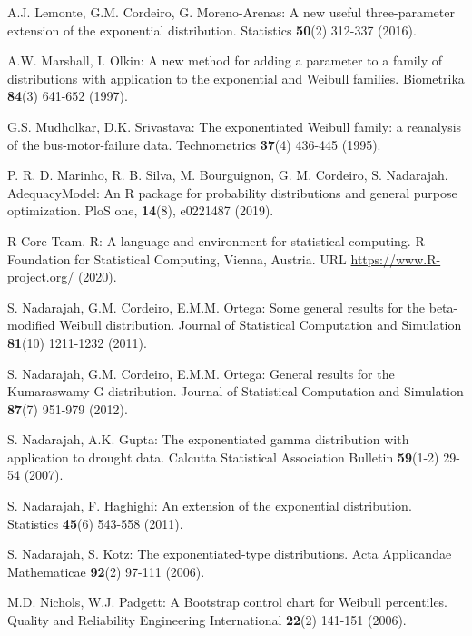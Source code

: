 \documentclass[12pt,a4paper]{article} %
\begin{document}
\begin{description}
\item
A.J. Lemonte, G.M. Cordeiro, G. Moreno-Arenas:
A new useful three-parameter extension of the exponential distribution.
Statistics {\bf 50}(2) 312-337 (2016).

\item
A.W. Marshall, I. Olkin:
A new method for adding a parameter to a family of distributions with
application to the exponential and Weibull families.
Biometrika {\bf 84}(3) 641-652 (1997).

\item
G.S. Mudholkar, D.K. Srivastava:
The exponentiated Weibull family: a reanalysis of the bus-motor-failure data.
Technometrics {\bf 37}(4) 436-445 (1995).

\item
P. R. D. Marinho,  R. B. Silva,  M. Bourguignon, G. M. Cordeiro,  S. Nadarajah. AdequacyModel: An R package for probability distributions and general purpose optimization. PloS one, {\bf 14}(8), e0221487 (2019).

\item
R Core Team. R: A language and environment for statistical computing. R Foundation for Statistical Computing, Vienna, Austria. URL
\url{https://www.R-project.org/} (2020).

\item
S. Nadarajah, G.M. Cordeiro, E.M.M. Ortega:
Some general results for the beta-modified Weibull distribution.
Journal of Statistical Computation and Simulation {\bf 81}(10) 1211-1232 (2011).

\item
S. Nadarajah, G.M. Cordeiro, E.M.M. Ortega:
General results for the Kumaraswamy G distribution.
Journal of Statistical Computation and Simulation {\bf 87}(7) 951-979 (2012).

\item
S. Nadarajah, A.K. Gupta:
The exponentiated gamma distribution with application to drought data.
Calcutta Statistical Association Bulletin {\bf 59}(1-2) 29-54 (2007).

\item
S. Nadarajah, F. Haghighi:
An extension of the exponential distribution.
Statistics {\bf 45}(6) 543-558 (2011).

\item
S. Nadarajah, S. Kotz:
The exponentiated-type distributions.
Acta Applicandae Mathematicae {\bf 92}(2) 97-111 (2006).

\item
M.D. Nichols, W.J. Padgett:
A Bootstrap control chart for Weibull percentiles.
Quality and Reliability Engineering International {\bf 22}(2) 141-151 (2006).


\end{description}
\end{document}
